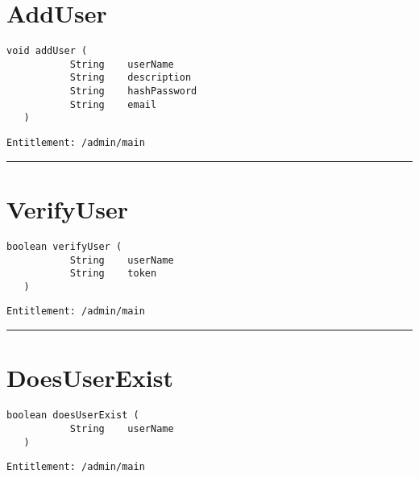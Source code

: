 \section{AddUser}
\label{Api:AddUser}
\begin{lstlisting}[style=nonumbers]
   void addUser (
           String    userName
           String    description
           String    hashPassword
           String    email
   )
\end{lstlisting}
\begin{Verbatim}[formatcom=\color{Maroon}]
  Entitlement: /admin/main
\end{Verbatim}



\rule{12cm}{2pt}
\section{VerifyUser}
\label{Api:VerifyUser}
\begin{lstlisting}[style=nonumbers]
   boolean verifyUser (
           String    userName
           String    token
   )
\end{lstlisting}
\begin{Verbatim}[formatcom=\color{Maroon}]
  Entitlement: /admin/main
\end{Verbatim}



\rule{12cm}{2pt}
\section{DoesUserExist}
\label{Api:DoesUserExist}
\begin{lstlisting}[style=nonumbers]
   boolean doesUserExist (
           String    userName
   )
\end{lstlisting}
\begin{Verbatim}[formatcom=\color{Maroon}]
  Entitlement: /admin/main
\end{Verbatim}



